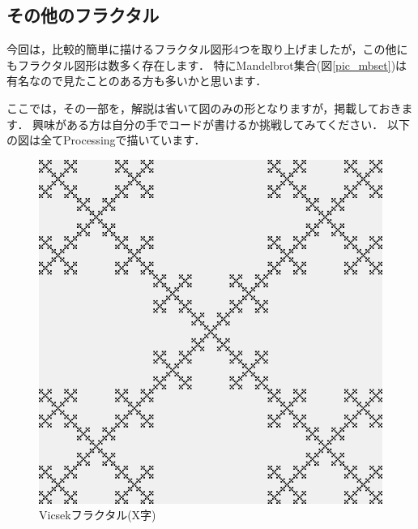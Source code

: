 \documentclass[dvipdfmx]{jsarticle}
\theoremstyle{definition}
\begin{document}
\subsection{その他のフラクタル}

今回は，比較的簡単に描けるフラクタル図形4つを取り上げましたが，この他にもフラクタル図形は数多く存在します．
特にMandelbrot集合(図\ref{pic_mbset})は有名なので見たことのある方も多いかと思います．

ここでは，その一部を，解説は省いて図のみの形となりますが，掲載しておきます．
興味がある方は自分の手でコードが書けるか挑戦してみてください．
以下の図は全てProcessingで描いています．


\begin{figure}[ht]
\begin{minipage}{0.5\hsize}
    \begin{center}
        \includegraphics[scale=0.20]{figure/vicsek_fractal_saltire.png}
    \end{center}
    \caption{Vicsekフラクタル(X字)}
    \label{pic_vicfr_x}
\end{minipage}
\begin{minipage}{0.49\hsize}
    \begin{center}

\end{center}
\end{minipage}
\end{figure}
\end{document}
